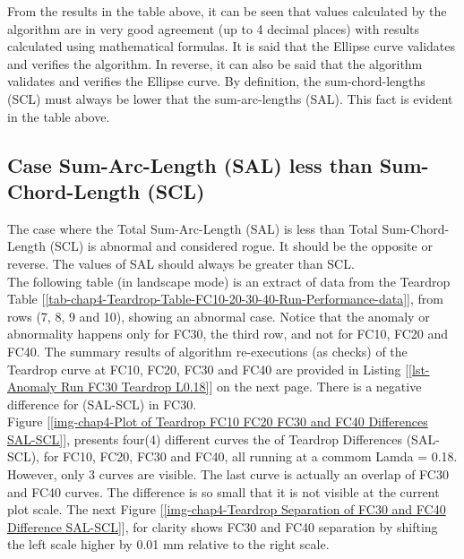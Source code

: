 From the results in the table above, it can be seen that values calculated by the algorithm are in very good agreement (up to 4 decimal places) with results calculated using mathematical formulas. It is said that the Ellipse curve validates and verifies the algorithm. In reverse, it can also be said that the algorithm validates and verifies the Ellipse curve. By definition, the sum-chord-lengths (SCL) must always be lower that the sum-arc-lengths (SAL). This fact is evident in the table above.


\clearpage
\pagebreak

\subsection{Case Sum-Arc-Length (SAL) less than Sum-Chord-Length (SCL)}
\label{ssec-Case Total Sum-Arc-Length SAL less than Total Sum-Chord-Length SCL}

The case where the Total Sum-Arc-Length (SAL) is less than Total Sum-Chord-Length (SCL) is abnormal and considered rogue. It should be the opposite or reverse. The values of SAL should always be greater than SCL. \\

The following table (in landscape mode) is an extract of data from the Teardrop Table [\ref{tab-chap4-Teardrop-Table-FC10-20-30-40-Run-Performance-data}], from rows (7, 8, 9 and 10), showing an abnormal case. Notice that the anomaly or abnormality happens only for FC30, the third row, and not for FC10, FC20 and FC40. The summary results of algorithm re-executions (as checks) of the Teardrop curve at FC10, FC20, FC30 and FC40 are provided in Listing [\ref{lst-Anomaly Run FC30 Teardrop L0.18}] on the next page. There is a negative difference for (SAL-SCL) in FC30.\\


Figure [\ref{img-chap4-Plot of Teardrop FC10 FC20 FC30 and FC40 Differences SAL-SCL}], presents four(4) different curves the of Teardrop Differences (SAL-SCL), for FC10, FC20, FC30 and FC40, all running at a commom Lamda = 0.18. However, only 3 curves are visible. The last curve is actually an overlap of FC30 and FC40 curves. The difference is so small that it is not visible at the current plot scale. The next Figure [\ref{img-chap4-Teardrop Separation of FC30 and FC40 Difference SAL-SCL}], for clarity shows FC30 and FC40 separation by shifting the left scale higher by 0.01 mm relative to the right scale. \\

